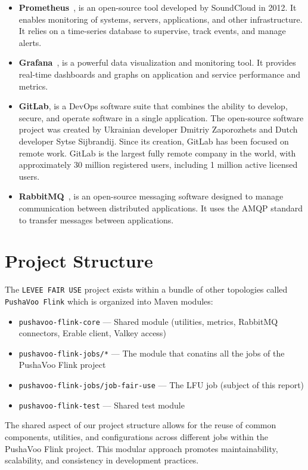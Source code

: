 \begin{itemize}
    \item[-] \textbf{Prometheus}~\cite{prometheus}, is an open-source tool developed by SoundCloud in 2012. It enables monitoring of systems, servers, applications, and other infrastructure. It relies on a time-series database to supervise, track events, and manage alerts.
    \item[-] \textbf{Grafana}~\cite{grafana}, is a powerful data visualization and monitoring tool. It provides real-time dashboards and graphs on application and service performance and metrics.
    \item[-] \textbf{GitLab}, is a DevOps software suite that combines the ability to develop, secure, and operate software in a single application. The open-source software project was created by Ukrainian developer Dmitriy Zaporozhets and Dutch developer Sytse Sijbrandij. Since its creation, GitLab has been focused on remote work. GitLab is the largest fully remote company in the world, with approximately 30 million registered users, including 1 million active licensed users.
    \item[-] \textbf{RabbitMQ}~\cite{RBMQ}, is an open-source messaging software designed to manage communication between distributed applications. It uses the AMQP standard to transfer messages between applications.
\end{itemize}

\section{Project Structure}

The \texttt{LEVEE FAIR USE} project exists within a bundle of other topologies called \texttt{PushaVoo Flink} which is organized into Maven modules:

\begin{itemize}
    \item \texttt{pushavoo-flink-core} --- Shared module (utilities, metrics, RabbitMQ connectors, Erable client, Valkey access)
    \item \texttt{pushavoo-flink-jobs/*} --- The module that conatins all the jobs of the PushaVoo Flink project
    \item \texttt{pushavoo-flink-jobs/job-fair-use} --- The LFU job (subject of this report)
    \item \texttt{pushavoo-flink-test} --- Shared test module
\end{itemize}

The shared aspect of our project structure allows for the reuse of common components, utilities, and configurations across different jobs within the PushaVoo Flink project.
This modular approach promotes maintainability, scalability, and consistency in development practices.

